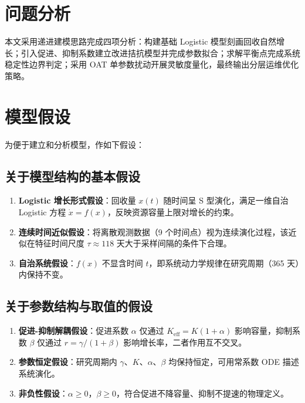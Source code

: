\documentclass[12pt,a4paper]{ctexart}
\begin{document}
\section{问题分析}

本文采用递进建模思路完成四项分析：构建基础 Logistic 模型刻画回收自然增长；引入促进、抑制系数建立改进拮抗模型并完成参数拟合；求解平衡点完成系统稳定性边界判定；采用 OAT 单参数扰动开展灵敏度量化，最终输出分层运维优化策略。

\section{模型假设}

为便于建立和分析模型，作如下假设：

\subsection{关于模型结构的基本假设}

\begin{enumerate}
    \item \textbf{Logistic 增长形式假设}：回收量 $x(t)$ 随时间呈 S 型演化，满足一维自治 Logistic 方程 $\dot{x} = f(x)$，反映资源容量上限对增长的约束。

    \item \textbf{连续时间近似假设}：将离散观测数据（9 个时间点）视为连续演化过程，该近似在特征时间尺度 $\tau \approx 118$ 天大于采样间隔的条件下合理。

    \item \textbf{自治系统假设}：$f(x)$ 不显含时间 $t$，即系统动力学规律在研究周期（365 天）内保持不变。
\end{enumerate}

\subsection{关于参数结构与取值的假设}

\begin{enumerate}
    \item[4.] \textbf{促进-抑制解耦假设}：促进系数 $\alpha$ 仅通过 $K_{\text{eff}} = K(1+\alpha)$ 影响容量，抑制系数 $\beta$ 仅通过 $r = \gamma/(1+\beta)$ 影响增长率，二者作用互不交叉。

    \item[5.] \textbf{参数恒定假设}：研究周期内 $\gamma$、$K$、$\alpha$、$\beta$ 均保持恒定，可用常系数 ODE 描述系统演化。

    \item[6.] \textbf{非负性假设}：$\alpha \geq 0$，$\beta \geq 0$，符合促进不降容量、抑制不提速的物理定义。
\end{enumerate}
\end{document}
